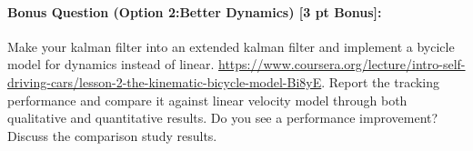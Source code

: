 \documentclass[11pt]{article}
\begin{document}
\paragraph{Bonus Question (Option 2:Better Dynamics) [3 pt Bonus]:}
Make your kalman filter into an extended kalman filter and implement a bycicle model for dynamics instead of linear. \url{https://www.coursera.org/lecture/intro-self-driving-cars/lesson-2-the-kinematic-bicycle-model-Bi8yE}. 
Report the tracking performance and compare it against linear velocity model through both qualitative and quantitative results. Do you see a performance improvement?  Discuss the comparison study results.
\end{document}

